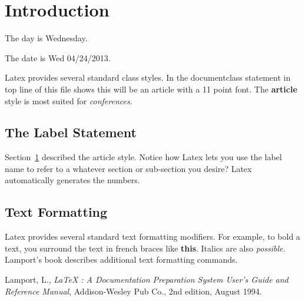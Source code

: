 \documentclass[11pt]{article}
\begin{document}
         
\section{Introduction}
\label{Introduction}

The day is Wednesday.  

The date is Wed 04/24/2013.

Latex provides several standard class styles.  In the
documentclass statement in top line of this file shows this
will be an article with a 11 point font.  The {\bf article} 
style is most suited for {\it conferences}.

\subsection{The Label Statement}
\label{labelStatement}

Section~\ref{Introduction} described the article style.  Notice
how Latex lets you use the label name to refer to a whatever
section or sub-section you desire?  Latex automatically generates
the numbers.

\subsection{Text Formatting}
\label{textFormatting}

Latex provides several standard text formatting modifiers.
For example, to bold a text, you surround the text in french
braces like {\bf this}.  Italics are also {\it possible}.
Lamport's book \cite{lamport} describes additional text formatting
commands.

\begin{thebibliography}{99}
 Lamport, L., {\it LaTeX : A Documentation
 Preparation System User's Guide and Reference Manual}, Addison-Wesley 
 Pub Co., 2nd edition, August 1994.
\end{thebibliography}
 
\end{document}
